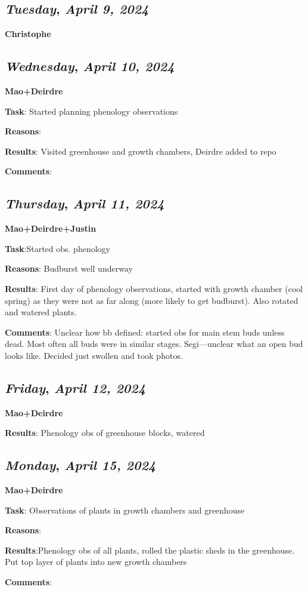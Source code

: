 \def\day{\textit{April 9, 2024}}
\def\weekday{\textit{Tuesday}}
\subsection*{\weekday, \day}
\textbf {Christophe}

\def\day{\textit{April 10, 2024}}
\def\weekday{\textit{Wednesday}}
\subsection*{\weekday, \day}
\textbf {Mao+Deirdre}
\par 
\textbf {Task}: Started planning phenology observations
\par 
\textbf {Reasons}: 
\par 
\textbf {Results}: Visited greenhouse and growth chambers, Deirdre added to repo
\par 
\textbf {Comments}:

\def\day{\textit{April 11, 2024}}
\def\weekday{\textit{Thursday}}
\subsection*{\weekday, \day}
\textbf {Mao+Deirdre+Justin}
\par 
\textbf {Task}:Started obs. phenology
\par 
\textbf {Reasons}: Budburst well underway
\par 
\textbf {Results}: First day of phenology observations, started with growth chamber (cool spring) as they were not as far along (more likely to get budburst). Also rotated and watered plants. 
\par 
\textbf {Comments}: Unclear how bb defined: started obs for main stem buds unless dead. Most often all buds were in similar stages. Segi---unclear what an open bud looks like. Decided just swollen and took photos. 

\def\day{\textit{April 12, 2024}}
\def\weekday{\textit{Friday}}
\subsection*{\weekday, \day}
\textbf {Mao+Deirdre}
\par 
\textbf {Results}: Phenology obs of greenhouse blocks, watered 

\def\day{\textit{April 15, 2024}}
\def\weekday{\textit{Monday}}
\subsection*{\weekday, \day}
\textbf {Mao+Deirdre}
\par 
\textbf {Task}: Observations of plants in growth chambers and greenhouse
\par 
\textbf {Reasons}: 
\par 
\textbf {Results}:Phenology obs of all plants, rolled the plastic sheds in the greenhouse. Put top layer of plants into new growth chambers
\par 
\textbf {Comments}:

